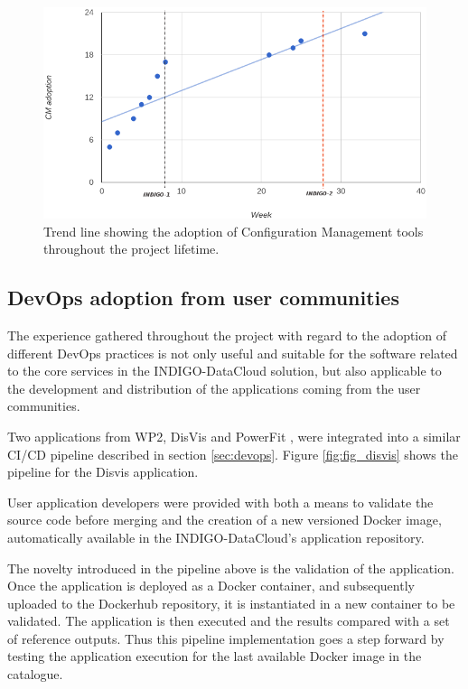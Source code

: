 \documentclass[journal]{IEEEtran}
\begin{document}
\begin{figure}
\centering
\includegraphics[width=\textwidth]{images/confman.png}
\caption{Trend line showing the adoption of Configuration Management tools throughout the project lifetime.}
\label{fig:fig_confman}
\end{figure}

\subsection{DevOps adoption from user communities}

The experience gathered throughout the project with regard to the adoption of
different DevOps practices is not only useful and suitable for the software related
to the core services in the INDIGO-DataCloud solution, but also applicable to the
development and distribution of the applications coming from the user communities.

Two applications from WP2, DisVis \cite{disvis} and PowerFit \cite{powerfit}, were
integrated into a similar CI/CD pipeline described in section \ref{sec:devops}.
Figure \ref{fig:fig_disvis} shows the pipeline for the Disvis application.

User application developers were provided with both a means to validate the
source code before merging and the creation of a new versioned Docker image,
automatically available in the INDIGO-DataCloud’s application repository.

The novelty introduced in the pipeline above is the validation of the application.
Once the application is deployed as a Docker container, and subsequently uploaded
to the Dockerhub repository, it is instantiated in a new container to be validated.
The application is then executed and the results compared with a set of reference outputs.
Thus this pipeline implementation goes a step forward by testing the application
execution for the last available Docker image in the catalogue.
\end{document}
